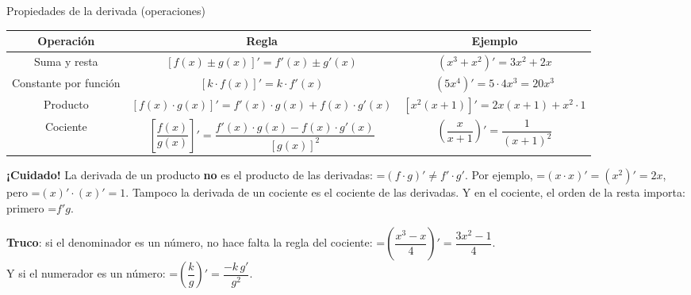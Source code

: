 \documentclass[11pt,a4paper]{article}
\newcommand{\fmm}[1]{\setbox0=\hbox{$#1$}\ifdim\wd0>\linewidth\[#1\]\else\mbox{\box0}\fi}
\newcommand{\fmuline}[1]{\textbf{\color{fmaccent}#1}}
\begin{document}
  
\begin{fmprop}{Propiedades de la derivada (operaciones)}
\begin{center}\renewcommand{\arraystretch}{1.5}\begin{tabular}{ccc}\toprule
\textbf{Operación} & \textbf{Regla} & \textbf{Ejemplo}\\\midrule
Suma y resta & $[f(x)\pm g(x)]'=f'(x)\pm g'(x)$ & $(x^3+x^2)'=3x^2+2x$\\
Constante por función & $[k\cdot f(x)]'=k\cdot f'(x)$ & $(5x^4)'=5\cdot4x^3=20x^3$\\
Producto & $[f(x)\cdot g(x)]'=f'(x)\cdot g(x)+f(x)\cdot g'(x)$ & $[x^2(x+1)]'=2x(x+1)+x^2\cdot1$\\[2ex]
Cociente & $\left[\dfrac{f(x)}{g(x)}\right]'=\dfrac{f'(x)\cdot g(x)-f(x)\cdot g'(x)}{[g(x)]^2}$ & $\left(\dfrac{x}{x+1}\right)'=\dfrac{1}{(x+1)^2}$\\[2ex]
\bottomrule\end{tabular}\end{center}

      
\begin{fmnote}\fmuline{¡Cuidado!} La derivada de un producto \textbf{no} es el producto de las derivadas: \fmm{(f\cdot g)'\neq f'\cdot g'}. Por ejemplo, \fmm{(x\cdot x)'=(x^2)'=2x}, pero \fmm{(x)'\cdot(x)'=1}. Tampoco la derivada de un cociente es el cociente de las derivadas. Y en el cociente, el orden de la resta importa: primero \fmm{f'g}.\end{fmnote}

      
\begin{fmnote}\fmuline{Truco}: si el denominador es un número, no hace falta la regla del cociente: \fmm{\left(\dfrac{x^3-x}{4}\right)'=\dfrac{3x^2-1}{4}}. \\
Y si el numerador es un número: \fmm{\left(\dfrac{k}{g}\right)'=\dfrac{-k\,g'}{g^2}}.\end{fmnote}
\end{fmprop}
\end{document}
